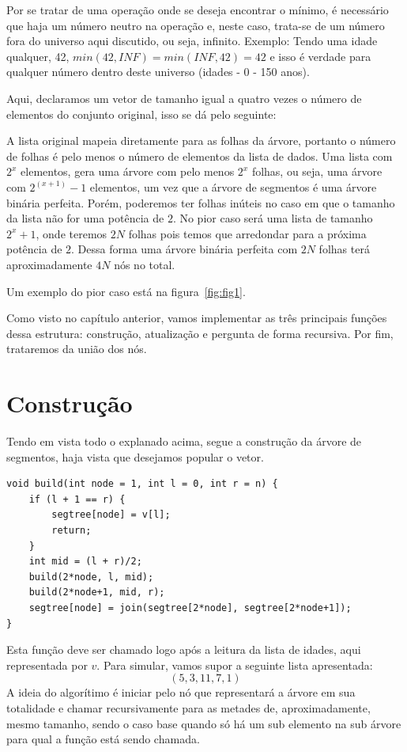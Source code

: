 Por se tratar de uma operação onde se deseja encontrar o mínimo, é necessário que haja um número neutro na operação e, neste caso, trata-se de um número fora do universo aqui discutido, ou seja, infinito.
Exemplo: Tendo uma idade qualquer, 42, $min(42, INF) = min(INF, 42) = 42$ e isso é verdade para qualquer número dentro deste universo (idades - 0 - 150 anos).

Aqui, declaramos um vetor de tamanho igual a quatro vezes o número de elementos
do conjunto original, isso se dá pelo seguinte:

A lista original mapeia diretamente para as folhas da árvore, portanto o número de folhas é pelo menos o número de elementos da lista de dados. Uma lista com $2^x$ elementos, gera uma árvore com pelo menos $2^x$ folhas, ou seja, uma árvore com $2^{(x+1)} - 1$ elementos, um vez que a árvore de segmentos é uma árvore binária perfeita. Porém, poderemos ter folhas inúteis no caso em que o tamanho da lista não for uma potência de $2$. No pior caso será uma lista de tamanho $2^x + 1$, onde teremos $2N$ folhas pois temos que arredondar para a próxima potência de $2$. Dessa forma uma árvore binária perfeita com $2N$ folhas terá aproximadamente $4N$ nós no total.

Um exemplo do pior caso está na figura~\ref{fig:fig1}.

Como visto no capítulo anterior, vamos implementar as três principais funções
dessa estrutura: construção, atualização e pergunta de forma recursiva. Por fim, trataremos da união dos nós.

\section{Construção}
Tendo em vista todo o explanado acima, segue a construção da árvore de segmentos, haja vista que desejamos popular o vetor.

\begin{lstlisting}
void build(int node = 1, int l = 0, int r = n) {
    if (l + 1 == r) {
        segtree[node] = v[l];
        return;
    }
    int mid = (l + r)/2;
    build(2*node, l, mid);
    build(2*node+1, mid, r);
    segtree[node] = join(segtree[2*node], segtree[2*node+1]);
}
\end{lstlisting}
Esta função deve ser chamado logo após a leitura da lista de idades, aqui representada por $v$. 
Para simular, vamos supor a seguinte lista apresentada:
$$(5, 3, 11, 7, 1)$$
A ideia do algorítimo é iniciar pelo nó que representará a árvore em sua totalidade e chamar recursivamente para as metades de, aproximadamente, mesmo tamanho, sendo o caso base quando só há um sub elemento na sub árvore para qual a função está sendo chamada.

